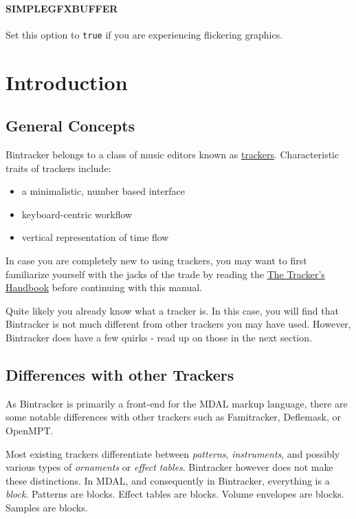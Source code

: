 \documentclass[12pt]{report}	%
\begin{document}
\subsubsection{SIMPLEGFXBUFFER}
Set this option to \texttt{true} if you are experiencing flickering graphics.


\chapter{Introduction}
\section{General Concepts}

Bintracker belongs to a class of music editors known as \href{https://en.wikipedia.org/wiki/Tracker_\%28music_software\%29}{trackers}. Characteristic traits of trackers include:

\begin{itemize}
\item a minimalistic, number based interface
\item keyboard-centric workflow
\item vertical representation of time flow
\end{itemize}

In case you are completely new to using trackers, you may want to first familiarize yourself with the jacks of the trade by reading the \href{http://resources.openmpt.org/tracker_handbook/handbook.htm}{The Tracker's Handbook} before continuing with this manual.

Quite likely you already know what a tracker is. In this case, you will find that Bintracker is not much different from other trackers you may have used. However, Bintracker does have a few quirks - read up on those in the next section.



\section{Differences with other Trackers}

As Bintracker is primarily a front-end for the MDAL markup language, there are some notable differences with other trackers such as Famitracker, Deflemask, or OpenMPT.

Most existing trackers differentiate between \textit{patterns}, \textit{instruments}, and possibly various types of \textit{ornaments} or \textit{effect tables}. Bintracker however does not make these distinctions. In MDAL, and consequently in Bintracker, everything is a \textit{block}. Patterns are blocks. Effect tables are blocks. Volume envelopes are blocks. Samples are blocks. 
\end{document}
